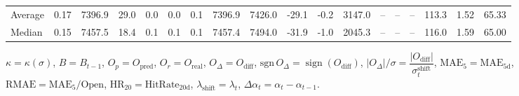 \begin{threeparttable}
{\begin{tabular}{lrrrrrrrrrrrrrrrrr}
Average &     0.17 & 7396.9 &              29.0 &               0.0 &                0.0 &                0.1 & 7396.9 & 7426.0 &      -29.1 &                     -0.2 &              3147.0 &         -- &        -- &             -- &            113.3 &            1.52 &                  65.33 \\
 Median &     0.15 & 7457.5 &              18.4 &               0.1 &                0.1 &                0.1 & 7457.4 & 7494.0 &      -31.9 &                     -1.0 &              2045.3 &         -- &        -- &             -- &            116.0 &            1.59 &                  65.00 \\
\bottomrule
\end{tabular}
}
\begin{tablenotes}\footnotesize
\item $\kappa=\kappa(\sigma)$, $B=B_{t-1}$, $O_p=O_{\text{pred}}$, $O_r=O_{\text{real}}$, $O_\Delta=O_{\text{diff}}$, $\mathrm{sgn}\,O_\Delta=\operatorname{sign}(O_{\text{diff}})$, $|O_\Delta|/\sigma=\dfrac{|O_{\text{diff}}|}{\sigma_t^{\text{shift}}}$, $\mathrm{MAE}_5=\mathrm{MAE}_{5\text{d}}$, $\mathrm{RMAE}= \mathrm{MAE}_5 / \text{Open}$, $\mathrm{HR}_{20}=\mathrm{HitRate}_{20\text{d}}$, 
$\lambda_{\text{shift}}=\lambda_t$, 
$\Delta\alpha_t=\alpha_t-\alpha_{t-1}$.
\end{tablenotes}
\end{threeparttable}
\endgroup

